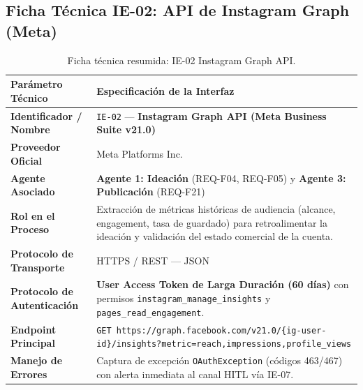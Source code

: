 \documentclass[11pt,a4paper]{article}
\begin{document}
\subsection{Ficha Técnica IE-02: API de Instagram Graph (Meta)}\label{sec:ie02}
\begin{table}[h!]
\centering
\small
\begin{tabular}{p{4.5cm} p{11cm}}
\toprule
\textbf{Parámetro Técnico} & \textbf{Especificación de la Interfaz} \\
\midrule
\textbf{Identificador / Nombre} & \texttt{IE-02} --- \textbf{Instagram Graph API (Meta Business Suite v21.0)} \\
\textbf{Proveedor Oficial} & Meta Platforms Inc. \\
\textbf{Agente Asociado} & \textbf{Agente 1: Ideación} (REQ-F04, REQ-F05) y \textbf{Agente 3: Publicación} (REQ-F21) \\
\textbf{Rol en el Proceso} & Extracción de métricas históricas de audiencia (alcance, engagement, tasa de guardado) para retroalimentar la ideación y validación del estado comercial de la cuenta. \\
\textbf{Protocolo de Transporte} & HTTPS / REST --- JSON \\
\textbf{Protocolo de Autenticación} & \textbf{User Access Token de Larga Duración (60 días)} con permisos \texttt{instagram\_manage\_insights} y \texttt{pages\_read\_engagement}. \\
\textbf{Endpoint Principal} & \texttt{GET https://graph.facebook.com/v21.0/\{ig-user-id\}/insights?metric=reach,impressions,profile\_views} \\
\textbf{Manejo de Errores} & Captura de excepción \texttt{OAuthException} (códigos 463/467) con alerta inmediata al canal HITL vía IE-07. \\
\bottomrule
\end{tabular}
\caption{Ficha técnica resumida: IE-02 Instagram Graph API.}
\end{table}
\end{document}
